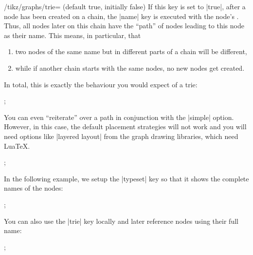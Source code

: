 \begin{key}{/tikz/graphs/trie= (default true, initially false)}
    If this key is set to |true|, after a node has been created on a chain, the
    |name| key is executed with the node's . Thus, all nodes
    later on this chain have the ``path'' of nodes leading to this node as
    their name. This means, in particular, that
    \begin{enumerate}
        \item two nodes of the same name but in different parts of a chain will
            be different,
        \item while if another chain starts with the same nodes, no new nodes
            get created.
    \end{enumerate}
    In total, this is exactly the behaviour you would expect of a trie:
\begin{codeexample}[preamble={\usetikzlibrary{graphs}}]
\tikz {};
\end{codeexample}
    You can even ``reiterate'' over a path in conjunction with the |simple|
    option. However, in this case, the default placement strategies will not
    work and you will need options like |layered layout| from the graph drawing
    libraries, which need Lua\TeX.
\ifluatex
\begin{codeexample}[preamble={\usetikzlibrary{graphs,graphdrawing}\usegdlibrary{layered}}]
\tikz {};
\end{codeexample}
    In the following example, we setup the |typeset| key so that it shows the
    complete names of the nodes:
\begin{codeexample}[preamble={\usetikzlibrary{graphs,graphdrawing}\usegdlibrary{layered}}]
\tikz {};
\end{codeexample}
\fi
    You can also use the |trie| key locally and later reference nodes using
    their full name:
\begin{codeexample}[preamble={\usetikzlibrary{graphs}}]
\tikz {};
\end{codeexample}
\end{key}


